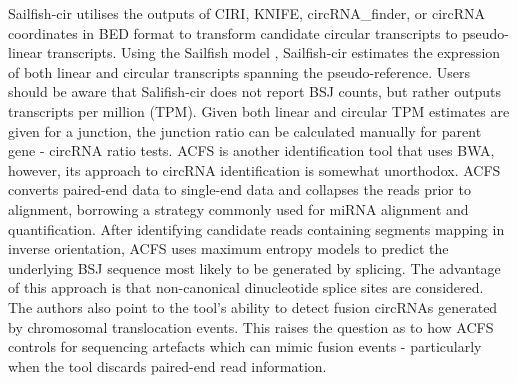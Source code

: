 \documentclass[pdflatex,sn-mathphys-num]{sn-jnl}
\begin{document}
Sailfish-cir \cite{Sailfishcir} utilises the outputs of CIRI, KNIFE, circRNA\_finder, or circRNA coordinates in BED format to transform candidate circular transcripts to pseudo-linear transcripts. Using the Sailfish model \cite{Patro2014May}, Sailfish-cir estimates the expression of both linear and circular transcripts spanning the pseudo-reference. Users should be aware that Salifish-cir does not report BSJ counts, but rather outputs transcripts per million (TPM). Given both linear and circular TPM estimates are given for a junction, the junction ratio can be calculated manually for parent gene - circRNA ratio tests. ACFS \cite{ACFS} is another identification tool that uses BWA, however, its approach to circRNA identification is somewhat unorthodox. ACFS converts paired-end data to single-end data and collapses the reads prior to alignment, borrowing a strategy commonly used for miRNA alignment and quantification. After identifying candidate reads containing segments mapping in inverse orientation, ACFS uses maximum entropy models to predict the underlying BSJ sequence most likely to be generated by splicing. The advantage of this approach is that non-canonical dinucleotide splice sites are considered. The authors also point to the tool's ability to detect fusion circRNAs generated by chromosomal translocation events. This raises the question as to how ACFS controls for sequencing artefacts which can mimic fusion events - particularly when the tool discards paired-end read information. \par
\end{document}
